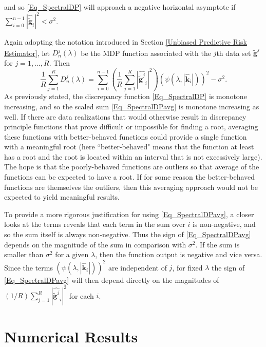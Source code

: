 \documentclass[12pt]{article}
\newcommand{\gnoise}{\widetilde{\mathbf{g}}}
\newcommand{\kdis}{\mathbf{k}}
\newcommand{\regparam}{\lambda}
\newcommand{\mfilt}{\psi}
\newcommand{\noiseSD}{\sigma}	%
\newcommand{\D}{D}	%
\begin{document}
and so \eqref{Eq_SpectralDP} will approach a negative horizontal asymptote if $\sum_{i = 0}^{n-1} |\widehat{\gnoise}_i|^2 < \noiseSD^2$. \par 
Again adopting the notation introduced in Section \ref{Unbiased Predictive Risk Estimator}, let $\D_n^j(\regparam)$ be the MDP function associated with the $j$th data set $\gnoise^j$ for $j = 1,\ldots,R$. Then 
\begin{equation}
\frac{1}{R}\sum_{j=1}^R \D_n^j(\regparam)  = \sum_{i = 0}^{n-1} \left(\frac{1}{R} \sum_{j=1}^R |\widehat{\gnoise^j}_i|^2\right)(\mfilt(\regparam,|\widehat{\kdis}_i|))^2 - \noiseSD^2. 
\label{Eq_SpectralDPavg}
\end{equation}
As previously stated, the discrepancy function \eqref{Eq_SpectralDP} is monotone increasing, and so the scaled sum \eqref{Eq_SpectralDPavg} is monotone increasing as well. If there are data realizations that would otherwise result in discrepancy principle functions that prove difficult or impossible for finding a root, averaging these functions with better-behaved functions could provide a single function with a meaningful root (here ``better-behaved" means that the function at least has a root and the root is located within an interval that is not excessively large). The hope is that the poorly-behaved functions are outliers so that average of the functions can be expected to have a root. If for some reason the better-behaved functions are themselves the outliers, then this averaging approach would not be expected to yield meaningful results. \par 
To provide a more rigorous justification for using \eqref{Eq_SpectralDPavg}, a closer looks at the terms reveals that each term in the sum over $i$ is non-negative, and so the sum itself is always non-negative. Thus the sign of \eqref{Eq_SpectralDPavg} depends on the magnitude of the sum in comparison with $\noiseSD^2$. If the sum is smaller than $\noiseSD^2$ for a given $\regparam$, then the function output is negative and vice versa. Since the terms $(\mfilt(\regparam,|\widehat{\kdis}_i|))^2$ are independent of $j$, for fixed $\regparam$ the sign of \eqref{Eq_SpectralDPavg} will then depend directly on the magnitudes of $(1/R) \sum_{j=1}^R |\widehat{\gnoise^j}_i|^2$ for each $i$.  

\section{Numerical Results} \label{Numerical results}
\end{document}
